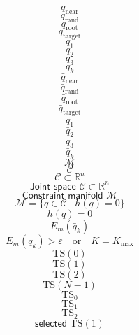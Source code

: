 \documentclass{article}
\begin{document}
\[
q_{\mathrm{near}}
\]
\[
q_{\mathrm{rand}}
\]
\[
q_{\mathrm{root}}
\]
\[
q_{\mathrm{target}}
\]
\[
q_{1}
\]
\[
q_{2}
\]
\[
q_{3}
\]
\[
q_{k}
\]
\[
\bar{q}_{\mathrm{near}}
\]
\[
\bar{q}_{\mathrm{rand}}
\]
\[
\bar{q}_{\mathrm{root}}
\]
\[
\bar{q}_{\mathrm{target}}
\]
\[
\bar{q}_{1}
\]
\[
\bar{q}_{2}
\]
\[
\bar{q}_{3}
\]
\[
\bar{q}_{k}
\]
\[
\mathcal{M}
\]
\[
\mathcal{C}
\]
\[
\mathcal{C}\subset\mathbb{R}^{n}
\]
\[
\textsf{Joint space }\mathcal{C}\subset\mathbb{R}^{n}
\]
\[
\textsf{Constraint manifold }\mathcal{M}
\]
\[
\mathcal{M}=\{q\in\mathcal{C}\mid h(q)=0\}
\]
\[
h(q)=0
\]
\[
E_m(\bar{q}_{k})
\]
\[
E_m(\bar{q}_{k})>\varepsilon\quad\text{or}\quad K=K_{\max}
\]
\[
\mathrm{TS}(0)
\]
\[
\mathrm{TS}(1)
\]
\[
\mathrm{TS}(2)
\]
\[
\mathrm{TS}(N-1)
\]
\[
\mathrm{TS}_{0}
\]
\[
\mathrm{TS}_{1}
\]
\[
\mathrm{TS}_{2}
\]
\[
\textsf{selected }\mathrm{TS}(1)
\]
\end{document}
